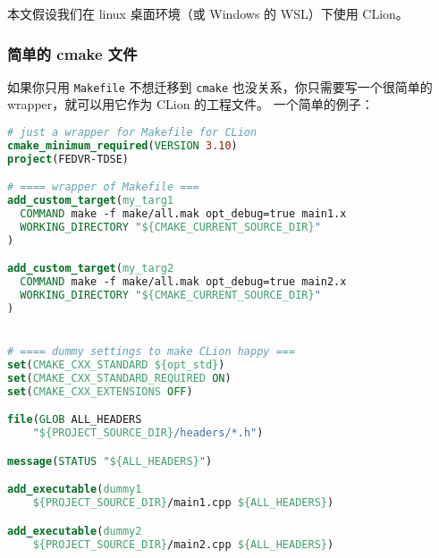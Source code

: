 
\begin{issues}
\issueDraft
\end{issues}

本文假设我们在 linux 桌面环境（或 Windows 的 WSL）下使用 CLion。

\subsubsection{简单的 cmake 文件}
如果你只用 \verb|Makefile| 不想迁移到 \verb|cmake| 也没关系，你只需要写一个很简单的 wrapper，就可以用它作为 CLion 的工程文件。 一个简单的例子：
\begin{lstlisting}[language=cmake]
# just a wrapper for Makefile for CLion
cmake_minimum_required(VERSION 3.10)
project(FEDVR-TDSE)

# ==== wrapper of Makefile ===
add_custom_target(my_targ1
  COMMAND make -f make/all.mak opt_debug=true main1.x
  WORKING_DIRECTORY "${CMAKE_CURRENT_SOURCE_DIR}"
)

add_custom_target(my_targ2
  COMMAND make -f make/all.mak opt_debug=true main2.x
  WORKING_DIRECTORY "${CMAKE_CURRENT_SOURCE_DIR}"
)


# ==== dummy settings to make CLion happy ===
set(CMAKE_CXX_STANDARD ${opt_std})
set(CMAKE_CXX_STANDARD_REQUIRED ON)
set(CMAKE_CXX_EXTENSIONS OFF)

file(GLOB ALL_HEADERS
    "${PROJECT_SOURCE_DIR}/headers/*.h")

message(STATUS "${ALL_HEADERS}")

add_executable(dummy1
    ${PROJECT_SOURCE_DIR}/main1.cpp ${ALL_HEADERS})

add_executable(dummy2
    ${PROJECT_SOURCE_DIR}/main2.cpp ${ALL_HEADERS})
\end{lstlisting}

